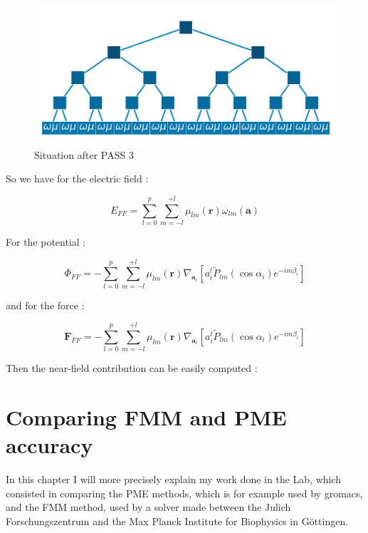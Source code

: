 \documentclass[12pt,twoside,a4paper]{report}
\begin{document}
\begin{figure}[H]
	\label{fig:farfield}
   \includegraphics[scale=0.5]{farfield}
    \centering 
    \caption{Situation after PASS 3 }
    
   \end{figure} 
   

   
   So we have for the electric field :
      
   \begin{equation}
   E_{FF} = \sum\limits_{l=0}^{p} \sum\limits_{m=-l}^{+l} \mu_{lm}(\textbf{r}) \omega_{lm}(\textbf{a})
   \end{equation}
   
   For the potential :
 
 	\begin{equation}
   \Phi_{FF} = - \sum\limits_{l=0}^{p} \sum\limits_{m=-l}^{+l} \mu_{lm}(\textbf{r}) \nabla_{\textbf{a}_i}[a_i^l \widetilde{P}_{lm}(\cos\alpha_i)e^{-im\beta_i}]
   \end{equation}
   
   and for the force :
   
   \begin{equation}
   \textbf{F}_{FF} = - \sum\limits_{l=0}^{p} \sum\limits_{m=-l}^{+l} \mu_{lm}(\textbf{r}) \nabla_{\textbf{a}_i}[a_i^l \widetilde{P}_{lm}(\cos\alpha_i)e^{-im\beta_i}]
   \end{equation}
   
 Then the near-field contribution can be easily computed : 

 

\chapter{Comparing FMM and PME accuracy}

    In this chapter I will more precisely explain my work done in the Lab, which consisted in comparing the PME methods, which is for example used by gromacs, and the FMM method, used by a solver made between the Julich Forschungszentrum and the Max Planck Institute for Biophysics in Göttingen.
\end{document}
